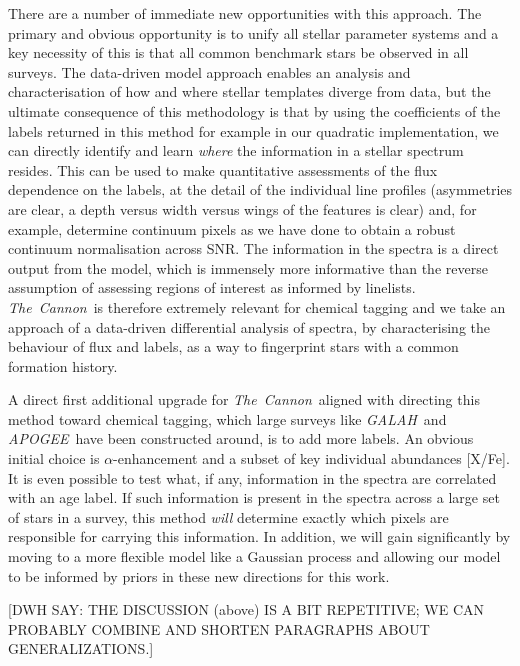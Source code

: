 \documentclass[12pt, preprint]{aastex}
\newcommand{\tc}{\textsl{The~Cannon}}
\newcommand{\apogee}{\textsl{APOGEE}}
\newcommand{\galah}{\textsl{GALAH}}
\begin{document}
 
There are a number of immediate new opportunities with this approach. 
The primary and obvious opportunity is to unify all stellar parameter systems and a key necessity of this is that all common benchmark stars be observed in all surveys. 
The data-driven model approach enables an analysis and characterisation of how and where stellar templates diverge from data, but the ultimate consequence of this methodology is that by using the coefficients of the labels returned in this method for example in our quadratic implementation, we can directly identify and learn \textit{where} the information in a stellar spectrum resides. 
This can be used to make quantitative assessments of the flux dependence on the labels, at the detail of the individual line profiles (asymmetries are clear, a depth versus width versus wings of the features is clear) and, for example, determine continuum pixels as we have done to obtain a robust continuum normalisation across SNR. 
The information in the spectra  is a direct output from the model, which is immensely more informative than the reverse assumption of assessing regions of interest as informed by linelists.  
\tc\ is therefore extremely relevant for chemical tagging and we take an approach of a data-driven differential analysis of spectra, by characterising the behaviour of flux and labels, as a way to fingerprint stars with a common formation history.

A direct first additional upgrade for \tc\ aligned with directing this method toward chemical tagging, which large surveys like \galah\ and \apogee\ have been constructed around,  is  to add more labels.
 An obvious initial choice is $\alpha$-enhancement and a subset of key individual abundances [X/Fe]. 
 It is even possible to test what, if any, information in the spectra are correlated with an age label. 
 If such information is present in the spectra across a large set of stars in a survey, this method \textit{will} determine exactly which pixels are responsible for carrying this information. In addition, we will gain significantly by moving to a more flexible model like a Gaussian process and allowing our model to be informed by priors in these new directions for this work. 

[DWH SAY:  THE DISCUSSION (above) IS A BIT REPETITIVE; WE CAN PROBABLY COMBINE AND SHORTEN PARAGRAPHS ABOUT GENERALIZATIONS.]
\end{document}
